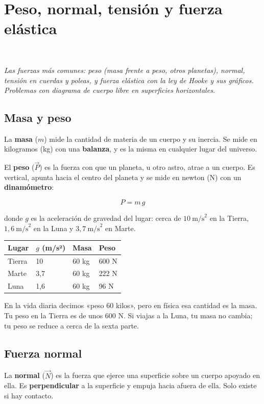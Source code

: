 \section[Peso, normal, tensión y fuerza elástica]{Peso, normal, tensión y fuerza elástica}
\modcomun\ \ {\color{gris}\itshape Las fuerzas más comunes: peso (masa frente a peso, otros planetas), normal, tensión en cuerdas y poleas, y fuerza elástica con la ley de Hooke y sus gráficos. Problemas con diagrama de cuerpo libre en superficies horizontales.\par}
\subsection{Masa y peso}
La \textbf{masa} ($m$) mide la cantidad de materia de un cuerpo y su inercia. Se mide en kilogramos (kg) con una \textbf{balanza}, y es la misma en cualquier lugar del universo.

 

El \textbf{peso} ($\vec P$) es la fuerza con que un planeta, u otro astro, atrae a un cuerpo. Es vertical, apunta hacia el centro del planeta y se mide en newton (N) con un \textbf{dinamómetro}:

 \[ P = m\,g \] 

donde $g$ es la aceleración de gravedad del lugar: cerca de $10\ \text{m/s}^2$ en la Tierra, $1{,}6\ \text{m/s}^2$ en la Luna y $3{,}7\ \text{m/s}^2$ en Marte.

  
\begin{center}\small
\begin{tabular}{@{}llll@{}}
\toprule
\textbf{Lugar} & \textbf{$g$ (m/s²)} & \textbf{Masa} & \textbf{Peso} \\
\midrule
Tierra & 10 & 60 kg & 600 N \\
Marte & 3,7 & 60 kg & 222 N \\
Luna & 1,6 & 60 kg & 96 N \\
\bottomrule
\end{tabular}
\end{center}
 
\begin{clave}[{Recuerda}] En la vida diaria decimos «peso 60 kilos», pero en física esa cantidad es la masa. Tu peso en la Tierra es de unos 600 N. Si viajas a la Luna, tu masa no cambia; tu peso se reduce a cerca de la sexta parte.\end{clave}
\subsection{Fuerza normal}
La \textbf{normal} ($\vec N$) es la fuerza que ejerce una superficie sobre un cuerpo apoyado en ella. Es \textbf{perpendicular} a la superficie y empuja hacia afuera de ella. Solo existe si hay contacto.

